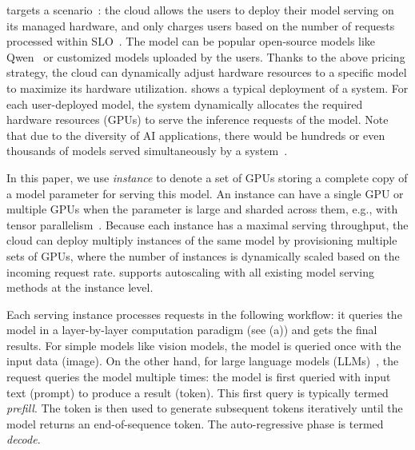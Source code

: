 {\sys} targets a {\maas} scenario~\cite{serverless-together-ai,serverless-ray,deepinfra,DBLP:conf/asplos/YangZLZLZCL22,ali-serverless-llm,aws-serverless-llm,DBLP:journals/corr/abs-2401-14351}:
the cloud allows the users to deploy their model serving on its managed hardware,
and only charges users based on the number of requests processed within SLO~\cite{aws-serverless-llm,ali-serverless-llm}.
The model can be popular open-source models like Qwen~\cite{qwens}
or customized models uploaded by the users.
Thanks to the above pricing strategy,
the cloud can dynamically adjust hardware resources to a specific model
to maximize its hardware utilization.
{} shows a typical deployment of a {\maas} system.
For each user-deployed model,
the system dynamically allocates the required hardware resources (GPUs) to serve the
inference requests of the model.
Note that due to the diversity of AI applications,
there would be hundreds or even thousands of models served simultaneously by a {\maas} system~\cite{alibailian}.

In this paper,
we use \emph{instance} to denote a set of GPUs storing
a complete copy of a model parameter for serving this model.
An instance can have a single GPU or multiple GPUs when the parameter
is large and sharded across them, e.g., with tensor parallelism~\cite{narayanan2021efficient}.
Because each instance has a maximal serving throughput,
the cloud can deploy multiply instances of the same model
by provisioning multiple sets of GPUs, 
where the number of instances is dynamically scaled based on the incoming request rate.
{\sys} supports autoscaling with all existing model serving methods at the instance level. 

Each serving instance processes requests in the following workflow:
it queries the model in a layer-by-layer computation paradigm (see {} (a))
and gets the final results.
For simple models like vision models,
the model is queried once with the input data (image).
On the other hand, for large language models (LLMs)~\cite{DBLP:conf/nips/VaswaniSPUJGKP17},
the request queries the model multiple times:
the model is first queried with input text (prompt)
to produce a result (token).
This first query is typically termed \emph{prefill}.
The token is then used to generate subsequent tokens iteratively
until the model returns an end-of-sequence token.
The auto-regressive phase is termed \emph{decode}.

